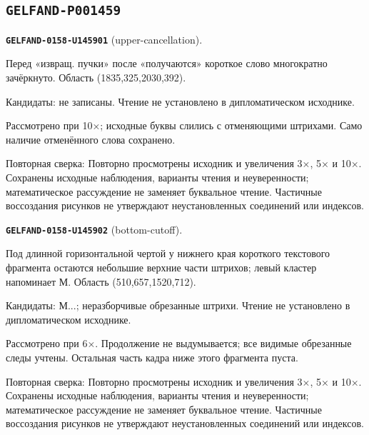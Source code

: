 \subsection*{\texttt{GELFAND-P001459}}
\par\noindent\leavevmode{}\label{GELFAND-0158-U145901}\label{GELFAND-P001459:upper-cancellation}\textbf{\texttt{GELFAND-0158-U145901}} (upper-cancellation).\nopagebreak[4]\par
Перед «извращ. пучки» после «получаются» короткое слово многократно зачёркнуто. Область (1835,325,2030,392).\par
Кандидаты: не записаны. Чтение не установлено в дипломатическом исходнике.\par
Рассмотрено при 10×; исходные буквы слились с отменяющими штрихами. Само наличие отменённого слова сохранено.\par
Повторная сверка: Повторно просмотрены исходник и увеличения 3×, 5× и 10×. Сохранены исходные наблюдения, варианты чтения и неуверенности; математическое рассуждение не заменяет буквальное чтение. Частичные воссоздания рисунков не утверждают неустановленных соединений или индексов.\par\medskip
\par\noindent\leavevmode{}\label{GELFAND-0158-U145902}\label{GELFAND-P001459:bottom-cutoff}\textbf{\texttt{GELFAND-0158-U145902}} (bottom-cutoff).\nopagebreak[4]\par
Под длинной горизонтальной чертой у нижнего края короткого текстового фрагмента остаются небольшие верхние части штрихов; левый кластер напоминает М. Область (510,657,1520,712).\par
Кандидаты: М...; неразборчивые обрезанные штрихи. Чтение не установлено в дипломатическом исходнике.\par
Рассмотрено при 6×. Продолжение не выдумывается; все видимые обрезанные следы учтены. Остальная часть кадра ниже этого фрагмента пуста.\par
Повторная сверка: Повторно просмотрены исходник и увеличения 3×, 5× и 10×. Сохранены исходные наблюдения, варианты чтения и неуверенности; математическое рассуждение не заменяет буквальное чтение. Частичные воссоздания рисунков не утверждают неустановленных соединений или индексов.\par\medskip
